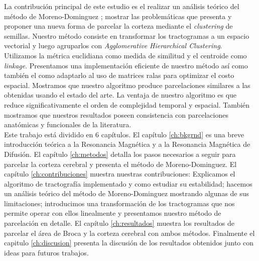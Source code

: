La contribuci\'on principal de este estudio es el realizar un an\'alisis
te\'orico del m\'etodo de Moreno-Dominguez \cite{Moreno-Dominguez2014};
mostrar las problem\'aticas que presenta y proponer una nueva forma de
parcelar la corteza mediante el \textit{clustering} de semillas. Nuestro 
m\'etodo consiste en transformar los tractogramas a un espacio vectorial
y luego agruparlos con \textit{Agglomerative Hierarchical Clustering}. Utilizamos la m\'etrica euclidiana como medida de similitud y el centroide
como \textit{linkage}. Presentamos una implementaci\'on eficiente de
nuestro m\'etodo as\'i como tambi\'en el como adaptarlo al uso de matrices
ralas para optimizar el costo espacial. Mostramos que nuestro algoritmo
produce parcelaciones similares a las obtenidas usando el estado
del arte. La ventaja de nuestro algoritmo es que reduce significativamente
el orden de complejidad temporal y espacial. Tambi\'en mostramos que
nuestros resultados poseen consistencia con parcelaciones anat\'omicas
\cite{Desikan2006} y funcionales \cite{Barch2013, Penfield1954} de la
literatura.  \\

Este trabajo est\'a dividido en 6 cap\'itulos. El cap\'itulo 
\ref{ch:bkgrnd} es una breve introducci\'on te\'orica a la Resonancia 
Magn\'etica y a la Resonancia Magn\'etica de Difusi\'on. El cap\'itulo
\ref{ch:metodos} detalla los pasos necesarios a seguir para parcelar la
corteza cerebral y presenta el m\'etodo de Moreno-Dominguez. El cap\'itulo
\ref{ch:contribuciones} muestra nuestras contribuciones: Explicamos el
algoritmo de tractograf\'ia implementado y como estudiar su estabilidad;
hacemos un an\'alisis te\'orico del m\'etodo de Moreno-Dominguez 
mostrando algunas de sus limitaciones; introducimos una transformaci\'on 
de los tractogramas que nos permite operar con ellos linealmente y
presentamos nuestro m\'etodo de parcelaci\'on en
detalle. El cap\'itulo \ref{ch:resultados} muestra los resultados de
parcelar el \'area de Broca y la corteza cerebral con ambos m\'etodos.
Finalmente el capitulo \ref{ch:discusion} presenta la discusi\'on de los
resultados obtenidos junto con ideas para futuros trabajos.

